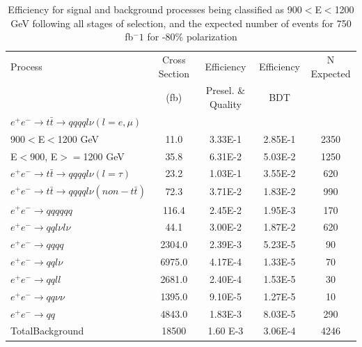 \begin{table}
  \centering
  \begin{tabular}{l | c | c | c | c}
    \toprule
     Process     & Cross Section & Efficiency & Efficiency & N Expected\\
     & (fb) & Presel. \& Quality & BDT & \\
     \midrule
    $e^+e^-\rightarrow t\bar{t} \rightarrow qqqql\nu (l=e,\mu)$&  &  & &\\
    900$<$E$<$1200 GeV & 11.0 & 3.33E-1 & 2.85E-1 & 2350\\
    E$<$900, E$>=$1200 GeV & 35.8 & 6.31E-2 & 5.03E-2 & 1250 \\
    \midrule
    $e^+e^-\rightarrow t\bar{t} \rightarrow qqqql\nu (l=\tau)$& 23.2 & 1.03E-1  & 3.55E-2 & 620 \\
    \midrule
    $e^+e^-\rightarrow t\bar{t} \rightarrow qqqql\nu (non-t\bar{t})$& 72.3 & 3.71E-2 & 1.83E-2 & 990\\
    \midrule
    $e^+e^-\rightarrow qqqqqq$ & 116.4 & 2.45E-2 & 1.95E-3& 170 \\
    \midrule
    $e^+e^-\rightarrow qql\nu l\nu$ & 44.1 & 3.00E-2 & 1.87E-2 & 620\\
    \midrule
    $e^+e^-\rightarrow qqqq$ & 2304.0 & 2.39E-3 & 5.23E-5 & 90 \\
    \midrule
    $e^+e^-\rightarrow qql\nu$ & 6975.0 & 4.17E-4& 1.33E-5& 70 \\
    \midrule
    $e^+e^-\rightarrow qqll$ & 2681.0 & 2.40E-4& 1.53E-5 & 30 \\
    \midrule
    $e^+e^-\rightarrow qq\nu\nu$ & 1395.0 & 9.10E-5 & 1.27E-5 & 10 \\
    \midrule
    $e^+e^-\rightarrow qq$ & 4843.0 & 1.83E-3 & 8.03E-5 & 290\\
    \midrule
    \midrule
    TotalBackground & 18500 & 1.60 E-3 & 3.06E-4&  4246 \\
    \bottomrule
  \end{tabular}
  \caption{Efficiency for signal and background processes being classified as 900$<$E$<$1200 GeV following all stages of selection, and the expected number of events for 750 fb$^-1$ for -80\% polarization}
  \label{table:topfinalefficienciesnegMidE}
\end{table}

